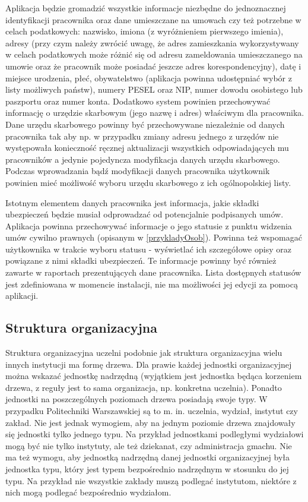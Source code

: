 Aplikacja będzie gromadzić wszystkie informacje niezbędne do jednoznacznej identyfikacji pracownika oraz dane umieszczane na umowach czy też potrzebne w celach podatkowych: nazwisko, imiona (z wyróżnieniem pierwszego imienia), adresy (przy czym należy zwrócić uwagę, że adres zamieszkania wykorzystywany w celach podatkowych może różnić się od adresu zameldowania umieszczanego na umowie oraz że pracownik może posiadać jeszcze adres korespondencyjny), datę i miejsce urodzenia, płeć, obywatelstwo (aplikacja powinna udostępniać wybór z listy możliwych państw), numery PESEL oraz NIP, numer dowodu osobistego lub paszportu oraz numer konta. Dodatkowo system powinien przechowywać informację o urzędzie skarbowym (jego nazwę i adres) właściwym dla pracownika. Dane urzędu skarbowego powinny być przechowywane niezależnie od danych pracownika tak aby np. w przypadku zmiany adresu jednego z urzędów nie występowała konieczność ręcznej aktualizacji wszystkich odpowiadających mu pracowników a jedynie pojedyncza modyfikacja danych urzędu skarbowego. Podczas wprowadzania bądź modyfikacji danych pracownika użytkownik powinien mieć możliwość wyboru urzędu skarbowego z ich ogólnopolskiej listy. 

Istotnym elementem danych pracownika jest informacja, jakie składki ubezpieczeń będzie musiał odprowadzać od potencjalnie podpisanych umów. Aplikacja powinna przechowywać informacje o jego statusie z punktu widzenia umów cywilno prawnych (opisanym w \ref{przykladyOsob}). Powinna też wspomagać użytkownika w trakcie wyboru statusu - wyświetlać ich szczegółowe opisy oraz powiązane z nimi składki ubezpieczeń. Te informacje powinny być również zawarte w raportach prezentujących dane pracownika. Lista dostępnych statusów jest zdefiniowana w momencie instalacji, nie ma możliwości jej edycji za pomocą aplikacji.

\subsection[Struktura organizacyjna][Struktura organizacyjna]{Struktura organizacyjna}
Struktura organizacyjna uczelni podobnie jak struktura organizacyjna wielu innych instytucji ma formę drzewa. Dla prawie każdej jednostki organizacyjnej można wskazać jednostkę nadrzędną (wyjątkiem jest jednostka będąca korzeniem drzewa, z reguły jest to sama organizacja, np. konkretna uczelnia). Ponadto jednostki na poszczególnych poziomach drzewa posiadają swoje typy. W przypadku Politechniki Warszawskiej są to m. in. uczelnia, wydział, instytut czy zakład. Nie jest jednak wymogiem, aby na jednym poziomie drzewa znajdowały się jednostki tylko jednego typu. Na przykład jednostkami podległymi wydziałowi mogą być nie tylko instytuty, ale też dziekanat, czy administracja gmachu. Nie ma też wymogu, aby jednostką nadrzędną danej jednostki organizacyjnej była jednostka typu, który jest typem bezpośrednio nadrzędnym w stosunku do jej typu. Na przykład nie wszystkie zakłady muszą podlegać instytutom, niektóre z nich mogą podlegać bezpośrednio wydziałom. 

